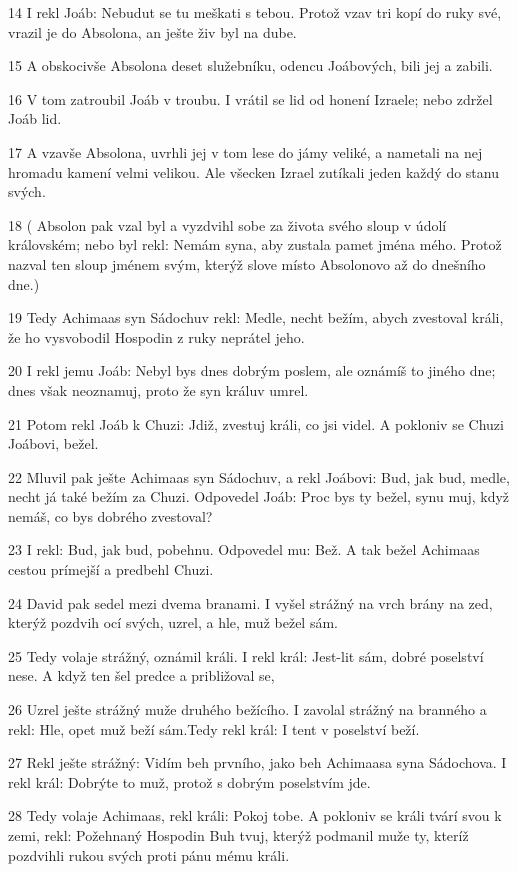 \par 14 I rekl Joáb: Nebudut se tu meškati s tebou. Protož vzav tri kopí do ruky své, vrazil je do Absolona, an ješte živ byl na dube.
\par 15 A obskocivše Absolona deset služebníku, odencu Joábových, bili jej a zabili.
\par 16 V tom zatroubil Joáb v troubu. I vrátil se lid od honení Izraele; nebo zdržel Joáb lid.
\par 17 A vzavše Absolona, uvrhli jej v tom lese do jámy veliké, a nametali na nej hromadu kamení velmi velikou. Ale všecken Izrael zutíkali jeden každý do stanu svých.
\par 18 ( Absolon pak vzal byl a vyzdvihl sobe za života svého sloup v údolí královském; nebo byl rekl: Nemám syna, aby zustala pamet jména mého. Protož nazval ten sloup jménem svým, kterýž slove místo Absolonovo až do dnešního dne.)
\par 19 Tedy Achimaas syn Sádochuv rekl: Medle, necht bežím, abych zvestoval králi, že ho vysvobodil Hospodin z ruky neprátel jeho.
\par 20 I rekl jemu Joáb: Nebyl bys dnes dobrým poslem, ale oznámíš to jiného dne; dnes však neoznamuj, proto že syn králuv umrel.
\par 21 Potom rekl Joáb k Chuzi: Jdiž, zvestuj králi, co jsi videl. A pokloniv se Chuzi Joábovi, bežel.
\par 22 Mluvil pak ješte Achimaas syn Sádochuv, a rekl Joábovi: Bud, jak bud, medle, necht já také bežím za Chuzi. Odpovedel Joáb: Proc bys ty bežel, synu muj, když nemáš, co bys dobrého zvestoval?
\par 23 I rekl: Bud, jak bud, pobehnu. Odpovedel mu: Bež. A tak bežel Achimaas cestou prímejší a predbehl Chuzi.
\par 24 David pak sedel mezi dvema branami. I vyšel strážný na vrch brány na zed, kterýž pozdvih ocí svých, uzrel, a hle, muž bežel sám.
\par 25 Tedy volaje strážný, oznámil králi. I rekl král: Jest-lit sám, dobré poselství nese. A když ten šel predce a približoval se,
\par 26 Uzrel ješte strážný muže druhého bežícího. I zavolal strážný na branného a rekl: Hle, opet muž beží sám.Tedy rekl král: I tent v poselství beží.
\par 27 Rekl ješte strážný: Vidím beh prvního, jako beh Achimaasa syna Sádochova. I rekl král: Dobrýte to muž, protož s dobrým poselstvím jde.
\par 28 Tedy volaje Achimaas, rekl králi: Pokoj tobe. A pokloniv se králi tvárí svou k zemi, rekl: Požehnaný Hospodin Buh tvuj, kterýž podmanil muže ty, kteríž pozdvihli rukou svých proti pánu mému králi.
